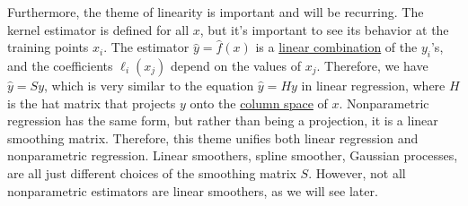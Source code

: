   Furthermore, the theme of linearity is important and will be recurring. The kernel estimator is defined for all $x$, but it's important to see its behavior at the training points $x_i$. The estimator $\hat{y} = \hat{f}(x)$ is a \hyperref[lin-def:linear-combination]{linear combination} of the $y_i$'s, and the coefficients $\ell_i (x_j)$ depend on the values of $x_j$. Therefore, we have $\hat{y} = S y$, which is very similar to the equation $\hat{y} = H y$ in linear regression, where $H$ is the hat matrix that projects $y$ onto the \hyperref[lin-def:column-space]{column space} of $x$. Nonparametric regression has the same form, but rather than being a projection, it is a linear smoothing matrix. Therefore, this theme unifies both linear regression and nonparametric regression. Linear smoothers, spline smoother, Gaussian processes, are all just different choices of the smoothing matrix $S$. However, not all nonparametric estimators are linear smoothers, as we will see later. 

